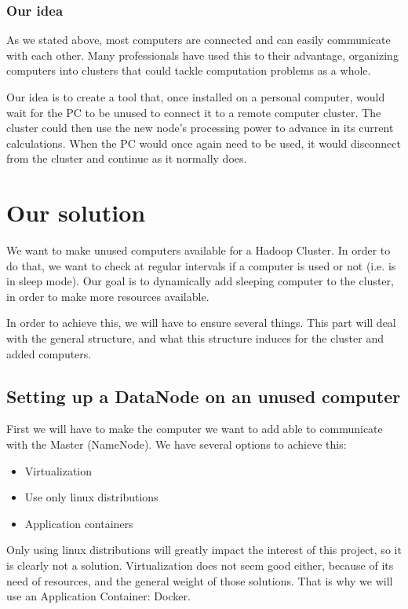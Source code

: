 \documentclass[11pt]{report} %
\begin{document}
\section{Our idea}
As we stated above, most computers are connected and can easily communicate with each other. Many professionals have used this to their advantage, organizing computers into clusters that could tackle computation problems as a whole.

Our idea is to create a tool that, once installed on a personal computer, would wait for the PC to be unused to connect it to a remote computer cluster. The cluster could then use the new node's processing power to advance in its current calculations. When the PC would once again need to be used, it would disconnect from the cluster and continue as it normally does.

\part{Our solution}
We want to make unused computers available for a Hadoop Cluster. In order to do that, we want to check at regular intervals if a computer is used or not (i.e. is in sleep mode). Our goal is to dynamically add sleeping computer to the cluster, in order to make more resources available.

In order to achieve this, we will have to ensure several things. This part will deal with the general structure, and what this structure induces for the cluster and added computers.

\chapter{Setting up a DataNode on an unused computer}
First we will have to make the computer we want to add able to communicate with the Master (NameNode). We have several options to achieve this: \begin{itemize}
\item Virtualization
\item Use only linux distributions
\item Application containers
\end{itemize}
Only using linux distributions will greatly impact the interest of this project, so it is clearly not a solution. Virtualization does not seem good either, because of its need of resources, and the general weight of those solutions. That is why we will use an Application Container: Docker.
\end{document}

